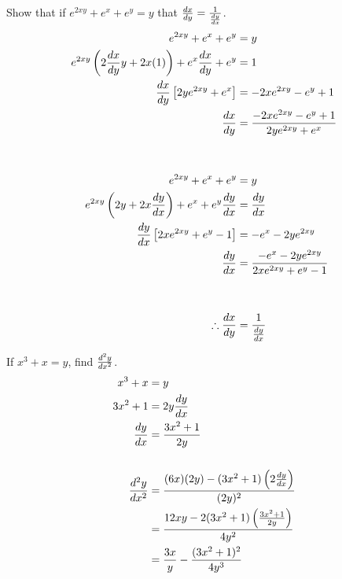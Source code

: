 \begin{exercise}\nonumber
    Show that if $ e^{2xy} +e^x + e^y = y $ that $ {dx \over dy} = {1 \over {dy \over dx}} $. \\

    \begin{align}
        e^{2xy} + e^x + e^y                                                  & = y                                            \\
        e^{2xy}\left(2{dx \over dy}y + 2x(1)\right) + e^x{dx \over dy} + e^y & = 1                                            \\
        {dx \over dy}\left[2ye^{2xy} + e^x\right]                            & = -2xe^{2xy} - e^y + 1                         \\
        {dx \over dy}                                                        & = {-2xe^{2xy} - e^y + 1 \over 2ye^{2xy} + e^x} \\
        \\
        \\
        e^{2xy} + e^x + e^y                                                  & = y                                            \\
        e^{2xy}\left(2y + 2x{dy \over dx}\right) + e^x + e^y{dy \over dx}    & = {dy \over dx}                                \\
        {dy \over dx}\left[2xe^{2xy} + e^y - 1\right]                        & = -e^x - 2ye^{2xy}                             \\
        {dy \over dx}                                                        & = {-e^x - 2ye^{2xy} \over 2xe^{2xy} + e^y -1}  \\
        \\
        \\
        \therefore {dx \over dy}                                             & = {1 \over {dy \over dx}}
    \end{align}
\end{exercise}

\begin{exercise}\nonumber
    If $ x^3 + x = y $, find $ d^2y \over dx^2 $. \\

    \begin{align}
        x^3 + x         & = y                                                             \\
        3x^2 + 1        & = 2y{dy \over dx}                                               \\
        {dy \over dx}   & = {3x^2 + 1 \over 2y}                                           \\
        \\
        d^2y \over dx^2 & = {(6x)(2y) - (3x^2+1)\left(2{dy \over dx}\right) \over (2y)^2} \\
                        & = {12xy - 2(3x^2+1)\left({3x^2+1 \over 2y}\right) \over 4y^2}   \\
                        & = {3x \over y} - {(3x^2+1)^2 \over 4y^3}
    \end{align}
\end{exercise}

